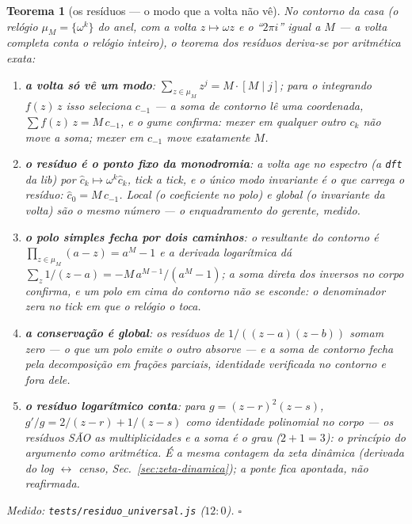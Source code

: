\documentclass[11pt,a4paper]{article}
\newtheorem{teorema}{Teorema}
\newcommand{\code}[1]{\texttt{\small #1}}
\begin{document}
\begin{teorema}[os res\'iduos --- o modo que a volta n\~ao v\^e]\label{thm:residuo}
No contorno da casa (o rel\'ogio $\mu_{M}=\{\omega^{k}\}$ do anel,
com a volta $z\mapsto\omega z$ e o ``$2\pi i$'' igual a $M$ --- a
volta completa conta o rel\'ogio inteiro), o teorema dos res\'iduos
deriva-se por aritm\'etica exata:
\begin{enumerate}
\item \textbf{a volta s\'o v\^e um modo}:
$\sum_{z\in\mu_{M}}z^{j}=M\cdot[M\mid j]$; para o integrando
$f(z)\,z$ isso seleciona $c_{-1}$ --- a soma de contorno l\^e
\emph{uma} coordenada, $\sum f(z)\,z=M\,c_{-1}$, e o gume confirma:
mexer em qualquer outro $c_{k}$ n\~ao move a soma; mexer em $c_{-1}$
move exatamente $M$.
\item \textbf{o res\'iduo \'e o ponto fixo da monodromia}: a volta
age no espectro (a \code{dft} da lib) por
$\hat{c}_{k}\mapsto\omega^{k}\hat{c}_{k}$, tick a tick, e o
\'unico modo invariante \'e o que carrega o res\'iduo:
$\hat{c}_{0}=M\,c_{-1}$. \emph{Local} (o coeficiente no polo) e
\emph{global} (o invariante da volta) s\~ao o mesmo n\'umero --- o
enquadramento do gerente, medido.
\item \textbf{o polo simples fecha por dois caminhos}: o resultante
do contorno \'e $\prod_{z\in\mu_{M}}(a-z)=a^{M}-1$ e a derivada
logar\'itmica d\'a $\sum_{z}1/(z-a)=-M\,a^{M-1}/(a^{M}-1)$; a soma
direta dos inversos no corpo confirma, e um polo \emph{em cima} do
contorno n\~ao se esconde: o denominador zera no tick em que o
rel\'ogio o toca.
\item \textbf{a conserva\c{c}\~ao \'e global}: os res\'iduos de
$1/((z-a)(z-b))$ somam \emph{zero} --- o que um polo emite o outro
absorve --- e a soma de contorno fecha pela decomposi\c{c}\~ao em
fra\c{c}\~oes parciais, identidade verificada no contorno e fora
dele.
\item \textbf{o res\'iduo logar\'itmico conta}: para
$g=(z-r)^{2}(z-s)$, $g'/g=2/(z-r)+1/(z-s)$ como identidade
polinomial no corpo --- os res\'iduos S\~AO as multiplicidades e a
soma \'e o grau ($2+1=3$): o princ\'ipio do argumento como
aritm\'etica. \'E a mesma contagem da zeta din\^amica (derivada do
log $\leftrightarrow$ censo, Sec.~\ref{sec:zeta-dinamica}); a ponte
fica apontada, n\~ao reafirmada.
\end{enumerate}
\emph{Medido:} \code{tests/residuo\_universal.js} ($12{:}0$).
$\square$
\end{teorema}
\end{document}
